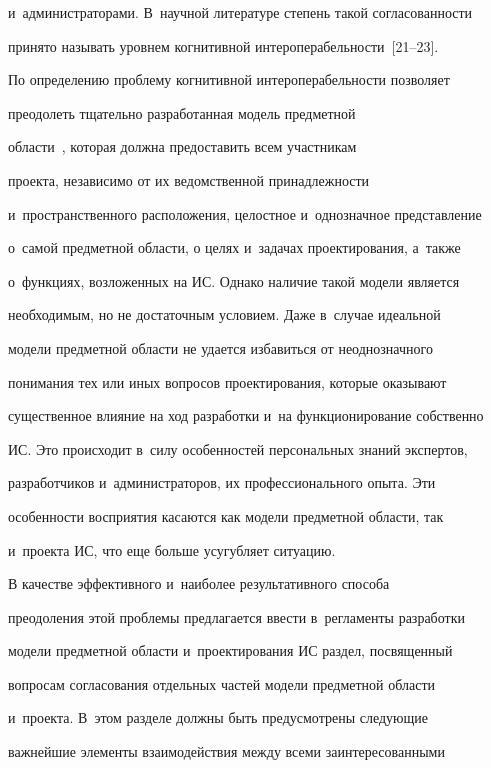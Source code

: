 и~администраторами. В~научной литературе степень такой согласованности 


принято называть уровнем когнитивной интероперабельности~[21--23].


    


    По определению проблему когнитивной интероперабельности позволяет 


преодолеть тщательно разработанная модель предметной  


области~\cite{19-luk}, которая должна предоставить всем участникам 


проекта, независимо от их ведомственной принадлежности 


и~пространственного расположения, целостное и~однозначное представление 


о~самой предметной области, о целях и~задачах проектирования, а~также 


о~функциях, возложенных на ИС. Однако наличие такой модели является 


необходимым, но не достаточным условием. Даже в~случае идеальной 


модели предметной области не удается избавиться от неоднозначного 


понимания тех или иных вопросов проектирования, которые оказывают 


существенное влияние на ход разработки и~на функционирование собственно 


ИС. Это происходит в~силу особенностей персональных знаний экспертов, 


разработчиков и~администраторов, их профессионального опыта. Эти 


особенности восприятия касаются как модели предметной области, так 


и~проекта ИС, что еще больше усугубляет ситуацию.


    


    В качестве эффективного и~наиболее результативного способа 


преодоления этой проблемы предлагается ввести в~регламенты разработки 


модели предметной области и~проектирования ИС раздел, посвященный 


вопросам согласования отдельных частей модели предметной области 


и~проекта. В~этом разделе должны быть предусмотрены следующие 


важнейшие элементы взаимодействия между всеми заинтересованными 


